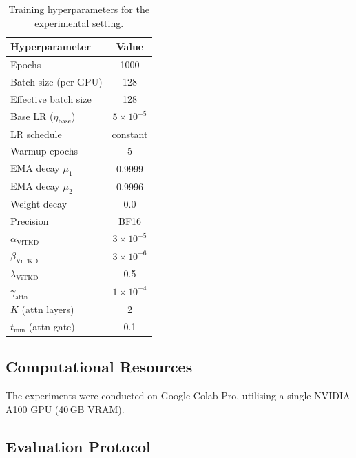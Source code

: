 \begin{table}[ht]
    \centering
    \caption{Training hyperparameters for the experimental setting.}
    \label{tab:training_hparams}
    \begin{tabular}{lc}
        \toprule
        Hyperparameter & Value \\
        \midrule
        Epochs                         & 1000          \\
        Batch size (per GPU)           & 128 \\
        Effective batch size           & 128 \\
        Base LR ($\eta_\text{base}$)   & $5 \times 10^{-5}$ \\
        LR schedule                    & constant      \\
        Warmup epochs                  & 5             \\
        EMA decay $\mu_1$              & 0.9999        \\
        EMA decay $\mu_2$              & 0.9996        \\
        Weight decay                   & 0.0           \\
        Precision                      & BF16          \\
        $\alpha_\text{ViTKD}$          & $3\times10^{-5}$ \\
        $\beta_\text{ViTKD}$           & $3\times10^{-6}$ \\
        $\lambda_\text{ViTKD}$         & 0.5           \\
        $\gamma_\text{attn}$           & $1\times10^{-4}$ \\
        $K$ (attn layers)              & 2             \\
        $t_{\min}$ (attn gate)         & 0.1           \\
        \bottomrule
    \end{tabular}
\end{table}


\subsection*{Computational Resources}
\label{subsec:compute}
The experiments were conducted on Google Colab Pro, utilising a single NVIDIA A100 GPU (40\,GB VRAM).

\subsection*{Evaluation Protocol}
\label{subsec:eval}

